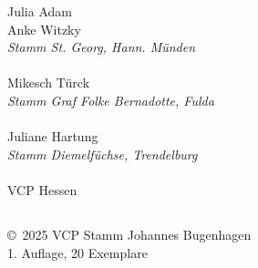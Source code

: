 \begin{centering}
\begin{multicols}{2}
        Julia Adam \\ Anke Witzky \\
        \textit{Stamm St. Georg, Hann. Münden}  \\ ~\\

        Mikesch Türck \\ \textit{Stamm Graf Folke Bernadotte, Fulda} \\ ~\\

        Juliane Hartung \\ \textit{Stamm Diemelfüchse, Trendelburg} \\ ~\\

        VCP Hessen

    \end{multicols}

    \subsection*{}

    \vfill
    \copyright~2025 VCP Stamm Johannes Bugenhagen \\
    1. Auflage, 20 Exemplare
    \vfill

\end{centering}